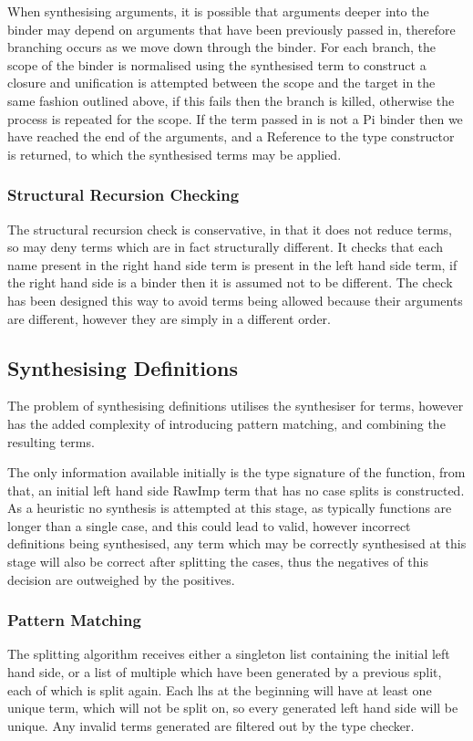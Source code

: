 \documentclass[a4paper]{article}
\begin{document}
When synthesising arguments, it is possible that arguments deeper into the binder
may depend on arguments that have been previously passed in, therefore branching 
occurs as we move down through the binder. For each branch, the scope of the binder
is normalised using the synthesised term to construct a closure and unification is 
attempted between the scope and the target in the same fashion outlined above, 
if this fails then the branch is killed, otherwise the process is repeated for the 
scope. If the term passed in is not a Pi binder then we have reached the end of the 
arguments, and a Reference to the type constructor is returned, to which the 
synthesised terms may be applied. 

\subsubsection{Structural Recursion Checking}
\label{sec:orgb4d20b2}
The structural recursion check is conservative, in that it does not reduce terms, 
so may deny terms which are in fact structurally different. It checks that each name
present in the right hand side term is present in the left hand side term, if the right 
hand side is a binder then it is assumed not to be different. The check has been designed
this way to avoid terms being allowed because their arguments are different, however they 
are simply in a different order.  	

\subsection{Synthesising Definitions}
\label{sec:org7318356}

The problem of synthesising definitions utilises the synthesiser for
terms, however has the added complexity of introducing pattern matching, 
and combining the resulting terms. 

The only information available initially is the type 
signature of the function, from that, an initial left hand side RawImp
term that has no case splits is constructed. As a heuristic no synthesis 
is attempted at this stage, as typically functions are longer than a single 
case, and this could lead to valid, however incorrect definitions being
synthesised, any term which may be correctly synthesised at this stage will 
also be correct after splitting the cases, thus the negatives of this decision
are outweighed by the positives.

\subsubsection{Pattern Matching}
\label{sec:org38930cc}
The splitting algorithm receives either a singleton list containing the initial
left hand side, or a list of multiple which have been generated by a previous split, 
each of which is split again. Each lhs at the beginning will have
at least one unique term, which will not be split on, so every generated
left hand side will be unique. Any invalid terms generated are filtered out by 
the type checker. 
\end{document}
